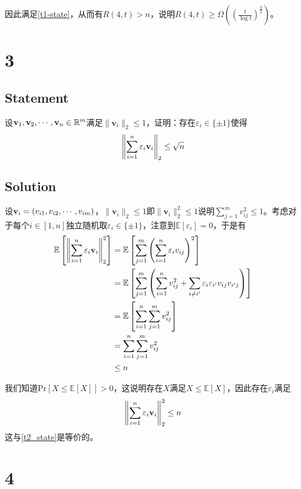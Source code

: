 \documentclass[UTF-8]{ctexart}
\begin{document}
因此满足\cref{t1-state}，从而有$R(4, t) > n$，说明$R(4, t) \ge \Omega\left(\left( \frac{t}{\log t} \right)^{\frac 32}\right)$。
\section*{3}
\subsection*{Statement}
设$\textbf v_1, \textbf v_2, \cdots, \textbf v_n \in \mathbb R^m$满足$\|\mathbf v_i\|_2 \le 1$，证明：存在$\varepsilon_i \in \{\pm 1\}$使得
\begin{equation}
\left\|\sum_{i=1}^{n}\varepsilon_i\textbf v_i\right\|_2 \le \sqrt n
\label{t2_state}
\end{equation}
\subsection*{Solution}

设$\textbf v_i = (v_{i1}, v_{i2}, \cdots, v_{im})$，$\|\mathbf v_i\|_2 \le 1$即$\|\mathbf v_i\|_2^2 \le 1$说明$\sum\limits_{j=1}^{m}v_{ij}^2 \le 1$。考虑对于每个$i \in [1, n]$独立随机取$\varepsilon_i \in \{\pm 1\}$，注意到$\mathbb E[\varepsilon_i] = 0$，于是有
\begin{equation}
\begin{split}
\mathbb E\left[\left\|\sum_{i=1}^{n}\varepsilon_i\textbf v_i\right\|_2^2\right] &= \mathbb E\left[\sum_{j=1}^{m}\left(\sum_{i=1}^{n}\varepsilon_iv_{ij}\right)^2\right]\\
&=\mathbb E\left[\sum_{j=1}^{m}\left(\sum_{i=1}^{n}v_{ij}^2 + \sum_{i \neq i'}\varepsilon_i\varepsilon_{i'}v_{ij}v_{i'j}\right)\right]\\
&=\mathbb E\left[\sum_{i=1}^{n}\sum_{j=1}^{m}v_{ij}^2 \right]\\
&= \sum_{i=1}^{n}\sum_{j=1}^{m}v_{ij}^2\\
&\le n
\end{split}
\end{equation}

我们知道$\text{Pr}[X \le \mathbb E[X]] > 0$，这说明存在$X$满足$X \le \mathbb E[X]$，因此存在$\varepsilon_i$满足\begin{equation}
\left\|\sum_{i=1}^{n}\varepsilon_i\textbf v_i\right\|_2^2 \le n
\end{equation}
这与\cref{t2_state}是等价的。

\section*{4}
\end{document}
